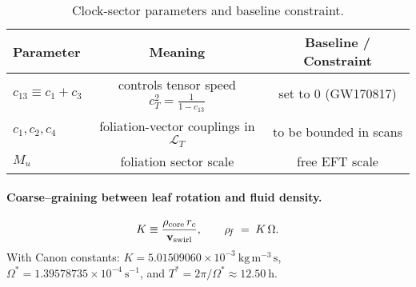 \begin{table}[h]
\centering
\caption{Clock-sector parameters and baseline constraint.}
\begin{tabular}{lcc}
\hline
Parameter & Meaning & Baseline / Constraint \\
\hline
$c_{13} \equiv c_1 + c_3$ & controls tensor speed $c_T^2=\frac{1}{1-c_{13}}$ & set to $0$ (GW170817) \\
$c_1,c_2,c_4$ & foliation-vector couplings in $\mathcal{L}_T$ & to be bounded in scans \\
$M_u$ & foliation sector scale & free EFT scale \\
\hline
\end{tabular}
\end{table}

\paragraph{Coarse--graining between leaf rotation and fluid density.}
\begin{equation}
K \equiv \frac{\rho_{\mathrm{core}}\, r_c}{\mathbf{v}_{\mathrm{swirl}}},
\qquad
\rho_{\!f} \;=\; K\,\Omega .
\end{equation}
With Canon constants: \(K = 5.01509060\times 10^{-3}\ \mathrm{kg\,m^{-3}\,s}\), \(\Omega^\ast = 1.39578735\times 10^{-4}\ \mathrm{s^{-1}}\), and \(T^\ast=2\pi/\Omega^\ast\approx 12.50\ \mathrm{h}\).
